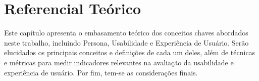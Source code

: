 \chapter[Referencial Teórico]{Referencial Teórico}

Este capítulo apresenta o embasamento teórico dos conceitos chaves abordados
neste trabalho, incluindo Persona, Usabilidade e Experiência de Usuário. Serão
elucidados os principais conceitos e definições de cada um deles, além de 
técnicas e métricas para medir indicadores relevantes na avaliação da 
usabilidade e experiência de usuário. Por fim, tem-se as considerações finais.

	